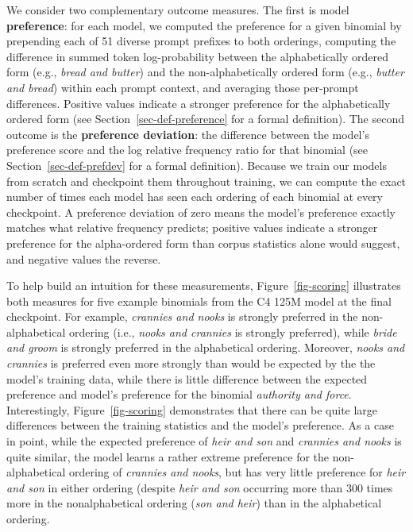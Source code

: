 \documentclass{article}
\begin{document}
We consider two complementary outcome measures. The first is model
\textbf{preference}: for each model, we computed the preference for a
given binomial by prepending each of 51 diverse prompt prefixes to both
orderings, computing the difference in summed token log-probability
between the alphabetically ordered form (e.g., \emph{bread and butter})
and the non-alphabetically ordered form (e.g., \emph{butter and bread})
within each prompt context, and averaging those per-prompt differences.
Positive values indicate a stronger preference for the alphabetically
ordered form (see Section~\ref{sec-def-preference} for a formal
definition). The second outcome is the \textbf{preference deviation}:
the difference between the model's preference score and the log relative
frequency ratio for that binomial (see Section~\ref{sec-def-prefdev} for
a formal definition). Because we train our models from scratch and
checkpoint them throughout training, we can compute the exact number of
times each model has seen each ordering of each binomial at every
checkpoint. A preference deviation of zero means the model's preference
exactly matches what relative frequency predicts; positive values
indicate a stronger preference for the alpha-ordered form than corpus
statistics alone would suggest, and negative values the reverse.

To help build an intuition for these measurements,
Figure~\ref{fig-scoring} illustrates both measures for five example
binomials from the C4 125M model at the final checkpoint. For example,
\emph{crannies and nooks} is strongly preferred in the non-alphabetical
ordering (i.e., \emph{nooks and crannies} is strongly preferred), while
\emph{bride and groom} is strongly preferred in the alphabetical
ordering. Moreover, \emph{nooks and crannies} is preferred even more
strongly than would be expected by the the model's training data, while
there is little difference between the expected preference and model's
preference for the binomial \emph{authority and force}. Interestingly,
Figure~\ref{fig-scoring} demonstrates that there can be quite large
differences between the training statistics and the model's preference.
As a case in point, while the expected preference of \emph{heir and son}
and \emph{crannies and nooks} is quite similar, the model learns a
rather extreme preference for the non-alphabetical ordering of
\emph{crannies and nooks}, but has very little preference for \emph{heir
and son} in either ordering (despite \emph{heir and son} occurring more
than 300 times more in the nonalphabetical ordering (\emph{son and
heir}) than in the alphabetical ordering.
\end{document}
